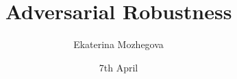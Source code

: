 




% 


\documentclass{article}

\usepackage{graphicx} %
\usepackage{amsmath} %
\usepackage{hyperref} %
\usepackage{listings} %
\usepackage{float} %

\title{Adversarial Robustness}
\author{Ekaterina Mozhegova}
\date{7th April}



\maketitle

The study is based on the tutorial "Adversarial Robustness - Theory and Practice".

\begin{abstract}
  Adversarial robustness is essential in security-critical tasks, such as computer vision or natural language processing. For example, in cybersecurity and healthcare domains.
\end{abstract}

